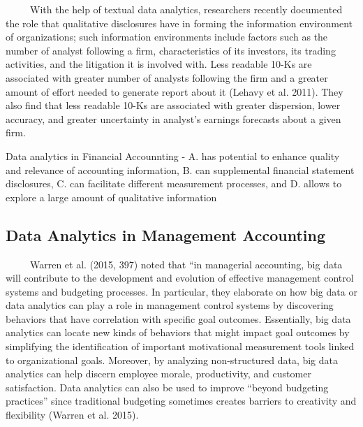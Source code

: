 \documentclass[
  letterpaper,
  DIV=11,
  numbers=noendperiod]{scrreprt}
\begin{document}
~~~~~With the help of textual data analytics, researchers recently
documented the role that qualitative disclosures have in forming the
information environment of organizations; such information environments
include factors such as the number of analyst following a firm,
characteristics of its investors, its trading activities, and the
litigation it is involved with. Less readable 10-Ks are associated with
greater number of analysts following the firm and a greater amount of
effort needed to generate report about it (Lehavy et al. 2011). They
also find that less readable 10-Ks are associated with greater
dispersion, lower accuracy, and greater uncertainty in analyst's
earnings forecasts about a given firm.

\begin{tcolorbox}[enhanced jigsaw, arc=.35mm, bottomrule=.15mm, bottomtitle=1mm, breakable, colback=white, colbacktitle=quarto-callout-caution-color!10!white, colframe=quarto-callout-caution-color-frame, coltitle=black, left=2mm, leftrule=.75mm, opacityback=0, opacitybacktitle=0.6, rightrule=.15mm, title=\textcolor{quarto-callout-caution-color}{\faFire}\hspace{0.5em}{Summary Point}, titlerule=0mm, toprule=.15mm, toptitle=1mm]

Data analytics in Financial Accounnting - A. has potential to enhance
quality and relevance of accounting information, B. can supplemental
financial statement disclosures, C. can facilitate different measurement
processes, and D. allows to explore a large amount of qualitative
information

\end{tcolorbox}

\subsection{Data Analytics in Management
Accounting}\label{data-analytics-in-management-accounting}

~~~~~Warren et al. (2015, 397) noted that ``in managerial accounting,
big data will contribute to the development and evolution of effective
management control systems and budgeting processes. In particular, they
elaborate on how big data or data analytics can play a role in
management control systems by discovering behaviors that have
correlation with specific goal outcomes. Essentially, big data analytics
can locate new kinds of behaviors that might impact goal outcomes by
simplifying the identification of important motivational measurement
tools linked to organizational goals. Moreover, by analyzing
non-structured data, big data analytics can help discern employee
morale, productivity, and customer satisfaction. Data analytics can also
be used to improve ``beyond budgeting practices'' since traditional
budgeting sometimes creates barriers to creativity and flexibility
(Warren et al. 2015).
\end{document}
